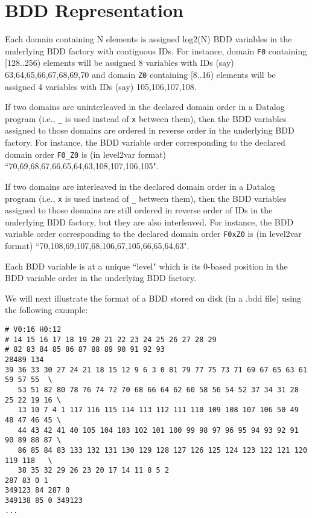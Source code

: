 \section{BDD Representation}
\label{sec:bdd}

Each domain containing N elements is assigned log2(N) BDD variables in the underlying BDD factory with contiguous IDs.
For instance,
domain {\tt F0} containing [128..256) elements will be assigned 8 variables with IDs (say) 63,64,65,66,67,68,69,70 and
domain {\tt Z0} containing [8..16) elements will be assigned 4 variables with IDs (say) 105,106,107,108.

If two domains are uninterleaved in the declared domain order in a Datalog program (i.e., {\tt \_} is used instead of {\tt x} between them),
then the BDD variables assigned to those domains are ordered in reverse order in the underlying BDD factory.
For instance, the BDD variable order corresponding to the declared domain order {\tt F0\_Z0} is (in level2var format)
``70,69,68,67,66,65,64,63,108,107,106,105".

If two domains are interleaved in the declared domain order in a Datalog program (i.e., {\tt x} is used instead of {\tt \_} between them),
then the BDD variables assigned to those domains are still ordered in reverse order of IDs in the underlying BDD factory,
but they are also interleaved.
For instance, the BDD variable order corresponding to the declared domain order {\tt F0xZ0} is (in level2var format)
``70,108,69,107,68,106,67,105,66,65,64,63".

Each BDD variable is at a unique ``level" which is its 0-based position in the BDD variable order in the underlying BDD factory.

We will next illustrate the format of a BDD stored on disk (in a .bdd file) using the following example:

\begin{verbatim}
# V0:16 H0:12
# 14 15 16 17 18 19 20 21 22 23 24 25 26 27 28 29
# 82 83 84 85 86 87 88 89 90 91 92 93
28489 134
39 36 33 30 27 24 21 18 15 12 9 6 3 0 81 79 77 75 73 71 69 67 65 63 61 59 57 55  \
   53 51 82 80 78 76 74 72 70 68 66 64 62 60 58 56 54 52 37 34 31 28 25 22 19 16 \
   13 10 7 4 1 117 116 115 114 113 112 111 110 109 108 107 106 50 49 48 47 46 45 \
   44 43 42 41 40 105 104 103 102 101 100 99 98 97 96 95 94 93 92 91 90 89 88 87 \
   86 85 84 83 133 132 131 130 129 128 127 126 125 124 123 122 121 120 119 118   \
   38 35 32 29 26 23 20 17 14 11 8 5 2
287 83 0 1
349123 84 287 0
349138 85 0 349123
...
\end{verbatim}

